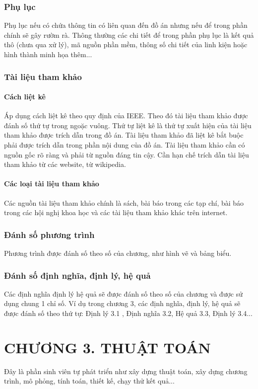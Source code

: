 \subsubsection{Phụ lục}
Phụ lục nếu có chứa thông tin có liên quan đến đồ án nhưng nếu để trong phần chính sẽ gây rườm rà. Thông thường các chi tiết để trong phần phụ lục là kết quả thô (chưa qua xử lý), mã nguồn phần mềm, thông số chi tiết của linh kiện hoặc hình thành minh họa thêm...
\subsubsection{Tài liệu tham khảo}
\paragraph{Cách liệt kê} \mbox{} %

Áp dụng cách liệt kê theo quy định của IEEE. Theo đó tài liệu tham khảo được đánh số thứ tự trong ngoặc vuông. Thứ tự liệt kê là thứ tự xuất hiện của tài liệu tham khảo được trích dẫn trong đồ án. Tài liệu tham khảo đã liệt kê bắt buộc phải được trích dẫn trong phần nội dung của đồ án. Tài liệu tham khảo cần có nguồn gốc rõ ràng và phải từ nguồn đáng tin cậy. Cần hạn chế trích dẫn tài liệu tham khảo từ các website, từ wikipedia.
\paragraph{Các loại tài liệu tham khảo} \mbox{} %

Các nguồn tài liệu tham khảo chính là sách, bài báo trong các tạp chí, bài báo trong các hội nghị khoa học và các tài liệu tham khảo khác trên internet.
\subsubsection{Đánh số phương trình}
Phương trình được đánh số theo số của chương, như hình vẽ và bảng biểu.
\subsubsection{Đánh số định nghĩa, định lý, hệ quả}
Các định nghĩa định lý hệ quả sẽ được đánh số theo số của chương và được sử dụng chung 1 chỉ số. Ví dụ trong chương 3, các định nghĩa, định lý, hệ quả sẽ được đánh số theo thứ tự: Định lý 3.1 , Định nghĩa 3.2, Hệ quả 3.3, Định lý 3.4...

\cleardoublepage
{}\section*{\centering CHƯƠNG 3. THUẬT TOÁN}
\setcounter{section}{3}
\setcounter{subsection}{0}
\setcounter{figure}{0}
\setcounter{table}{0}
Đây \cite{stein2011fourier} là phần sinh viên tự phát triển như xây dựng thuật toán, xây dựng chương trình, mô phỏng, tính toán, thiết kế, chạy thử kết quả... \cite{howell2016principles}
